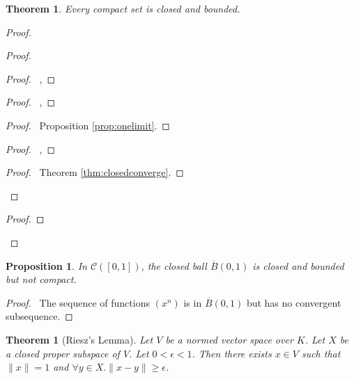 \documentclass{book}
\let\qed\relax
\newtheorem{prop}[ax]{Proposition}
\newtheorem{thm}[ax]{Theorem}
\theoremstyle{definition}
\begin{document}
\begin{thm}
Every compact set is closed and bounded.
\end{thm}

\begin{proof}
\pf
{}
\begin{proof}
	\begin{proof}
		\pf\ , 
	\end{proof}
	\begin{proof}
		\pf\ , 
	\end{proof}
	\begin{proof}
		\pf\ Proposition \ref{prop:onelimit}.
	\end{proof}
	\begin{proof}
		\pf\ , 
	\end{proof}
	\qedstep
	\begin{proof}
		\pf\ Theorem \ref{thm:closedconverge}.
	\end{proof}
\end{proof}
\begin{proof}
\end{proof}
\qed
\end{proof}

\begin{prop}
In $\mathcal{C}([0,1])$, the closed ball $\overline{B}(0,1)$ is closed and bounded but not compact.
\end{prop}

\begin{proof}
\pf\ The sequence of functions $(x^n)$ is in $\overline{B}(0,1)$ but has no convergent subsequence. \qed
\end{proof}

\begin{thm}[Riesz's Lemma]
Let $V$ be a normed vector space over $K$. Let $X$ be a closed proper subspace of $V$. Let $0 < \epsilon < 1$. Then there exists $x \in V$ such that $\| x \| = 1$ and $\forall y \in X. \|x-y\| \geq \epsilon$.
\end{thm}
\end{document}
